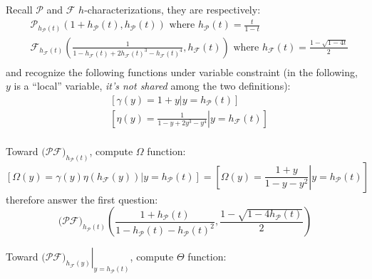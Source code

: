Recall $\mathcal{P}$ and $\mathcal{F}$ $h$-characterizations, they are respectively:
\begin{displaymath}
    \begin{split}
        &\mathcal{P}_{h_{\mathcal{P}}(t)}\left( 1+h_{\mathcal{P}}(t), h_{\mathcal{P}}(t) \right)
            \text{ where } h_{\mathcal{P}}(t) = \frac{t}{1-t}\\
        &\mathcal{F}_{h_{\mathcal{F}}(t)}\left( \frac{1}{1-h_{\mathcal{F}}(t)+
            2h_{\mathcal{F}}(t)^3-h_{\mathcal{F}}(t)^4}, h_{\mathcal{F}}(t) \right)
                \text{ where } h_{\mathcal{F}}(t) = \frac{1-\sqrt{1-4t}}{2}\\
    \end{split}
\end{displaymath}
and recognize the following functions under variable constraint (in the following, $y$
is a ``local'' variable, \emph{it's not shared} among the two definitions):
\begin{displaymath}
    \begin{split}
        &\left.\left[\gamma(y) = 1+y \right| y=h_{\mathcal{P}}(t) \right]\\
        &\left.\left[\eta(y) = \frac{1}{1-y+2y^3-y^4} \right| y=h_{\mathcal{F}}(t) \right]\\
    \end{split}
\end{displaymath}

Toward $\big(\mathcal{P}\mathcal{F}\big)_{h_{\mathcal{P}}(t)}$, compute $\Omega$ function:
\begin{displaymath}
    \left.\left[\Omega(y)= \gamma(y)\eta(h_{\mathcal{F}}(y))\right| y=h_{\mathcal{P}}(t) \right]
        = \left.\left[\Omega(y)= \frac{1+y}{1-y-y^2}\right| y=h_{\mathcal{P}}(t) \right]
\end{displaymath}
therefore answer the first question:
\begin{displaymath}
    \big(\mathcal{P}\mathcal{F}\big)_{h_{\mathcal{P}}(t)} \left(\frac{1+
        h_{\mathcal{P}}(t)}{1-h_{\mathcal{P}}(t)-h_{\mathcal{P}}(t)^2}, \frac{1-\sqrt{1-4h_{\mathcal{P}}(t)}}{2} \right)
\end{displaymath}

Toward $\left.\big(\mathcal{P}\mathcal{F}\big)_{h_{\mathcal{F}}(y)}\right|_{y=h_{\mathcal{P}}(t)}$, compute $\Theta$ function:

